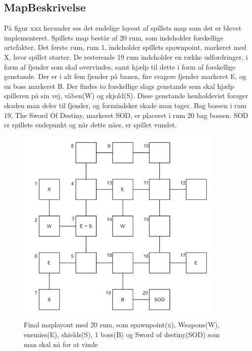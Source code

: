 \subsection{MapBeskrivelse}

På figur xxx herunder ses det endelige layout af spillets map som det er blevet implementeret. 
Spillets map består af 20 rum, som indeholder forskellige artefakter.  
Det første rum, rum 1, indeholder spillets spawnpoint, markeret med X, hvor spillet starter.  
De resterende 19 rum indeholder en række udfordringer, i form af fjender som skal overvindes, samt hjælp til dette i form af forskellige genstande. 
Der er i alt fem fjender på banen, fire svagere fjender markeret E, og en boss markeret B. 
Der findes to forskellige slags genstande som skal hjælp spilleren på sin vej, våben(W) og skjold(S).  
Disse genstande henholdsvist forøger skaden man deler til fjender, og formindsker skade man tager. 
Bag bossen i rum 19, 
The Sword Of Destiny, markeret SOD, er placeret i rum 20 bag bossen. SOD er spillets endepunkt og når dette nåes, er spillet vundet.



\begin{figure}[H]
\centering
\includegraphics[width = 0.9\textwidth]{02-Body/Images/MapLayout.PNG}
\caption{Final maplayout med 20 rum, som spawnpoint(x), Weapons(W), enemies(E), shields(S), 1 boss(B) og Sword of destiny(SOD) som man skal nå for at vinde}
\label{fig:MapLayout-final}
\end{figure}